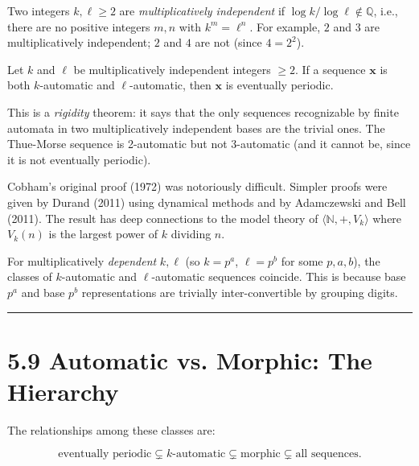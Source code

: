 \begin{definition}
Two integers $k, \ell \geq 2$ are \textit{multiplicatively independent} if $\log k / \log \ell \notin \mathbb{Q}$, i.e., there are no positive integers $m, n$ with $k^m = \ell^n$. For example, $2$ and $3$ are multiplicatively independent; $2$ and $4$ are not (since $4 = 2^2$).
\end{definition}

\begin{theorem}[Cobham 1969]
Let $k$ and $\ell$ be multiplicatively independent integers $\geq 2$. If a sequence $\mathbf{x}$ is both $k$-automatic and $\ell$-automatic, then $\mathbf{x}$ is eventually periodic.

This is a \textit{rigidity} theorem: it says that the only sequences recognizable by finite automata in two multiplicatively independent bases are the trivial ones. The Thue-Morse sequence is 2-automatic but not 3-automatic (and it cannot be, since it is not eventually periodic).

Cobham's original proof (1972) was notoriously difficult. Simpler proofs were given by Durand (2011) using dynamical methods and by Adamczewski and Bell (2011). The result has deep connections to the model theory of $\langle \mathbb{N}, +, V_k \rangle$ where $V_k(n)$ is the largest power of $k$ dividing $n$.
\end{theorem}

\begin{remark}
For multiplicatively \textit{dependent} $k, \ell$ (so $k = p^a$, $\ell = p^b$ for some $p, a, b$), the classes of $k$-automatic and $\ell$-automatic sequences coincide. This is because base $p^a$ and base $p^b$ representations are trivially inter-convertible by grouping digits.

\bigskip\hrule\bigskip
\end{remark}

\section{5.9 Automatic vs. Morphic: The Hierarchy}

The relationships among these classes are:

\[
\text{eventually periodic} \subsetneq k\text{-automatic} \subsetneq \text{morphic} \subsetneq \text{all sequences}.
\]

